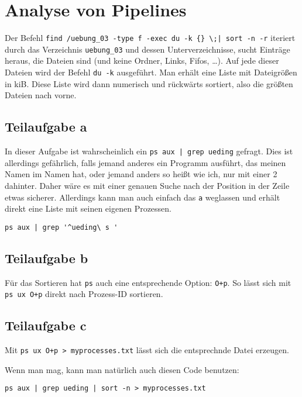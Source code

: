 \documentclass[12pt]{report}
\begin{document}



\section{Analyse von Pipelines}

Der Befehl \verb#find /uebung_03 -type f -exec du -k {} \;| sort -n -r# iteriert durch das Verzeichnis \verb#uebung_03# und dessen Unterverzeichnisse, sucht Einträge heraus, die Dateien sind (und keine Ordner, Links, Fifos, …). Auf jede dieser Dateien wird der Befehl \texttt{du -k} ausgeführt. Man erhält eine Liste mit Dateigrößen in kiB. Diese Liste wird dann numerisch und rückwärts sortiert, also die größten Dateien nach vorne.

\subsection{Teilaufgabe a}
In dieser Aufgabe ist wahrscheinlich ein \verb#ps aux | grep ueding# gefragt. Dies ist allerdings gefährlich, falls jemand anderes ein Programm ausführt, das meinen Namen im Namen hat, oder jemand anders so heißt wie ich, nur mit einer 2 dahinter. Daher wäre es mit einer genauen Suche nach der Position in der Zeile etwas sicherer. Allerdings kann man auch einfach das \texttt{a} weglassen und erhält direkt eine Liste mit seinen eigenen Prozessen.

\begin{lstlisting}[caption=Einschänkung des Suchbereichs]
ps aux | grep '^ueding\ s '
\end{lstlisting}

\subsection{Teilaufgabe b}
Für das Sortieren hat \texttt{ps} auch eine entsprechende Option: \texttt{O+p}. So lässt sich mit \texttt{ps ux O+p} direkt nach Prozess-ID sortieren.

\subsection{Teilaufgabe c}
Mit \verb#ps ux O+p > myprocesses.txt# lässt sich die entsprechnde Datei erzeugen.  


Wenn man mag, kann man natürlich auch diesen Code benutzen:
\begin{lstlisting}[caption=verkettete Pipes]
ps aux | grep ueding | sort -n > myprocesses.txt
\end{lstlisting}
\end{document}
